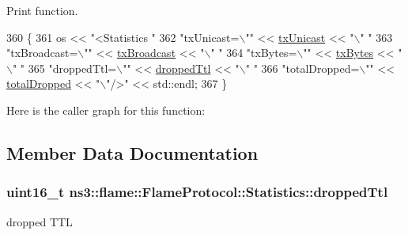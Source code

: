 Print function. 


\begin{DoxyCode}
360 \{
361   os << \textcolor{stringliteral}{"<Statistics "}
362   \textcolor{stringliteral}{"txUnicast=\(\backslash\)""} << \hyperlink{structns3_1_1flame_1_1FlameProtocol_1_1Statistics_ac982655d8d0713a26f8844b982c2e84e}{txUnicast} << \textcolor{stringliteral}{"\(\backslash\)" "}
363   \textcolor{stringliteral}{"txBroadcast=\(\backslash\)""} << \hyperlink{structns3_1_1flame_1_1FlameProtocol_1_1Statistics_a0ba404c358cf7b3dda7eef14e20ddeac}{txBroadcast} << \textcolor{stringliteral}{"\(\backslash\)" "}
364   \textcolor{stringliteral}{"txBytes=\(\backslash\)""} << \hyperlink{structns3_1_1flame_1_1FlameProtocol_1_1Statistics_a6e9193135a5ce66fc2195afe99118bb9}{txBytes} << \textcolor{stringliteral}{"\(\backslash\)" "}
365   \textcolor{stringliteral}{"droppedTtl=\(\backslash\)""} << \hyperlink{structns3_1_1flame_1_1FlameProtocol_1_1Statistics_aa8bce610a8fb9ff1989ee347fdc32120}{droppedTtl} << \textcolor{stringliteral}{"\(\backslash\)" "}
366   \textcolor{stringliteral}{"totalDropped=\(\backslash\)""} << \hyperlink{structns3_1_1flame_1_1FlameProtocol_1_1Statistics_a9bbb45f9d30c589661435636b6065ef7}{totalDropped} << \textcolor{stringliteral}{"\(\backslash\)"/>"} << std::endl;
367 \}
\end{DoxyCode}


Here is the caller graph for this function\+:




\subsection{Member Data Documentation}
\subsubsection[{\texorpdfstring{dropped\+Ttl}{droppedTtl}}]{\setlength{\rightskip}{0pt plus 5cm}uint16\+\_\+t ns3\+::flame\+::\+Flame\+Protocol\+::\+Statistics\+::dropped\+Ttl}\hypertarget{structns3_1_1flame_1_1FlameProtocol_1_1Statistics_aa8bce610a8fb9ff1989ee347fdc32120}{}\label{structns3_1_1flame_1_1FlameProtocol_1_1Statistics_aa8bce610a8fb9ff1989ee347fdc32120}


dropped T\+TL 

